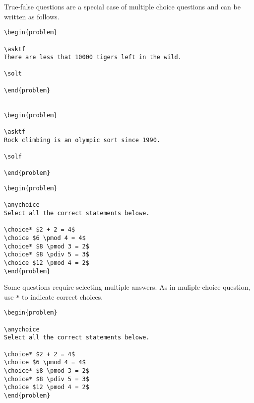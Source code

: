 \begin{cluster}
\label{grp:xmpl:quiz::true-false-questions}

\begin{example}
\label{xmpl:quiz::true-false-questions}
True-false questions are a special case of multiple choice questions
and can be written as follows.

\begin{lstlisting}
\begin{problem}

\asktf
There are less that 10000 tigers left in the wild.

\solt

\end{problem}


\begin{problem}

\asktf
Rock climbing is an olympic sort since 1990.

\solf

\end{problem}
\end{lstlisting}



\begin{lstlisting}
\begin{problem}

\anychoice
Select all the correct statements belowe.

\choice* $2 + 2 = 4$
\choice $6 \pmod 4 = 4$
\choice* $8 \pmod 3 = 2$
\choice* $8 \pdiv 5 = 3$
\choice $12 \pmod 4 = 2$
\end{problem}
\end{lstlisting}

\end{example}
\end{cluster}

\begin{cluster}
\label{grp:xmpl:quiz::multi-answer-questions}

\begin{example}
\label{xmpl:quiz::multi-answer-questions}
Some questions require selecting multiple answers.
As in muliple-choice question, use \lstinline`*` to indicate correct choices.

\begin{lstlisting}
\begin{problem}

\anychoice
Select all the correct statements belowe.

\choice* $2 + 2 = 4$
\choice $6 \pmod 4 = 4$
\choice* $8 \pmod 3 = 2$
\choice* $8 \pdiv 5 = 3$
\choice $12 \pmod 4 = 2$
\end{problem}
\end{lstlisting}

\end{example}
\end{cluster}

